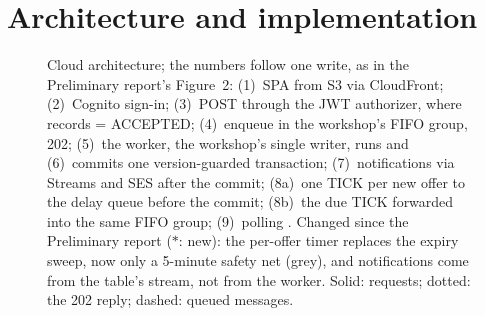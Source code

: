 \section{Architecture and implementation}\label{sec:architecture}

\begin{figure}[b]
  \centering
  \caption{Cloud architecture; the numbers follow one write, as in the Preliminary report's Figure~2:
  (1)~SPA from S3 via CloudFront; (2)~Cognito sign-in; (3)~POST through the JWT authorizer, where
   records  = ACCEPTED; (4)~enqueue in the workshop's FIFO group, 202;
  (5)~the worker, the workshop's single writer, runs  and (6)~commits one
  version-guarded transaction; (7)~notifications via Streams and SES after the commit; (8a)~one TICK
  per new offer to the delay queue before the commit; (8b)~the due TICK forwarded into the same FIFO
  group; (9)~polling . Changed since the Preliminary report ($\ast$: new):
  the per-offer timer replaces the expiry sweep, now only a 5-minute safety net (grey), and
  notifications come from the table's stream, not from the worker. Solid: requests; dotted: the 202
  reply; dashed: queued messages.}
  \label{fig:arch}
\end{figure}

